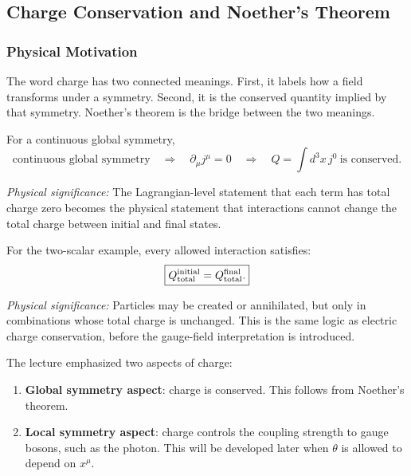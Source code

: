 \documentclass[../main.tex]{subfiles}
\begin{document}
\subsection*{Charge Conservation and Noether's Theorem}

\subsubsection*{Physical Motivation}

The word charge has two connected meanings.  First, it labels how a field transforms under a symmetry.  Second, it is the conserved quantity implied by that symmetry.  Noether's theorem is the bridge between the two meanings.

For a continuous global symmetry,
\begin{equation}
  \boxed{
  \text{continuous global symmetry}
  \quad\Longrightarrow\quad
  \partial_\mu j^\mu=0
  \quad\Longrightarrow\quad
  Q=\int d^3x\,j^0\ \text{is conserved}.}
  \label{eq:lec09:noether-chain}
\end{equation}

\textit{Physical significance:} The Lagrangian-level statement that each term has total charge zero becomes the physical statement that interactions cannot change the total charge between initial and final states.

For the two-scalar example, every allowed interaction satisfies:
\begin{equation}
  \boxed{
  Q_{\rm total}^{\rm initial}=Q_{\rm total}^{\rm final}.}
  \label{eq:lec09:charge-conservation}
\end{equation}

\textit{Physical significance:} Particles may be created or annihilated, but only in combinations whose total charge is unchanged.  This is the same logic as electric charge conservation, before the gauge-field interpretation is introduced.

The lecture emphasized two aspects of charge:
\begin{enumerate}
  \item \textbf{Global symmetry aspect}: charge is conserved.  This follows from Noether's theorem.
  \item \textbf{Local symmetry aspect}: charge controls the coupling strength to gauge bosons, such as the photon.  This will be developed later when $\theta$ is allowed to depend on $x^\mu$.
\end{enumerate}
\end{document}

